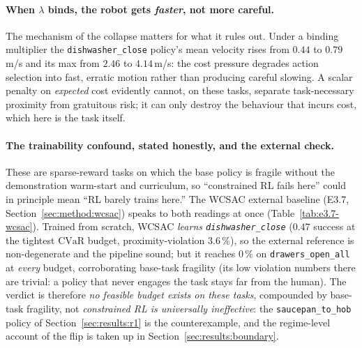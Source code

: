 \documentclass[11pt,a4paper]{report}
\newcommand{\cvar}{\ensuremath{\mathrm{CVaR}}}
\begin{document}
\paragraph{When $\lambda$ binds, the robot gets \emph{faster}, not more careful.}
The mechanism of the collapse matters for what it rules out. Under a
binding multiplier the \texttt{dishwasher\_close} policy's mean velocity rises from
$0.44$ to $0.79$\,m/s and its max from $2.46$ to $4.14$\,m/s: the
cost pressure degrades action selection into fast, erratic motion
rather than producing careful slowing. A scalar penalty on
\emph{expected} cost evidently cannot, on these tasks, separate
task-necessary proximity from gratuitous risk; it can only destroy
the behaviour that incurs cost, which here is the task itself.

\paragraph{The trainability confound, stated honestly, and the external check.}
\label{sec:results:wcsac}
These are sparse-reward tasks on which the base policy is fragile
without the demonstration warm-start and curriculum, so ``constrained
RL fails here'' could in principle mean ``RL barely trains here.''
The WCSAC external baseline (E3.7, Section~\ref{sec:method:wcsac})
speaks to both readings at once (Table~\ref{tab:e3.7-wcsac}).
Trained from scratch, WCSAC \emph{learns \texttt{dishwasher\_close}} ($0.47$ success
at the tightest \cvar{} budget, proximity-violation $3.6\,\%$), so
the external reference is non-degenerate and the pipeline sound; but
it reaches $0\,\%$ on \texttt{drawers\_open\_all} at \emph{every} budget, corroborating
base-task fragility (its low violation numbers there are trivial: a
policy that never engages the task stays far from the human). The
verdict is therefore \emph{no feasible budget exists on these
tasks}, compounded by base-task fragility, not \emph{constrained RL
is universally ineffective}: the \texttt{saucepan\_to\_hob} policy of
Section~\ref{sec:results:r1} is the
counterexample, and the regime-level account of the flip is
taken up in Section~\ref{sec:results:boundary}.
\end{document}
